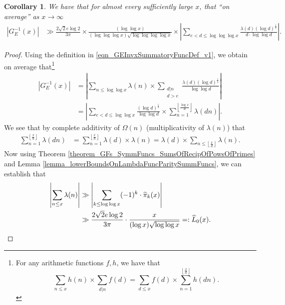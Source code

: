 \documentclass[11pt,reqno,a4letter]{article}
\numberwithin{figure}{section}
\numberwithin{table}{section}
\newcommand{\cf}{\textit{cf.\ }}
\newcommand{\Floor}[2]{\ensuremath{\left\lfloor \frac{#1}{#2} \right\rfloor}}
\theoremstyle{plain}
\newtheorem{cor}[theorem]{Corollary}
\numberwithin{theorem}{section}
\theoremstyle{definition}
\newcommand{\NBRef}[1]{}
\newcommand{\SuccSim}[0]{\overset{_{\scriptsize{\blacktriangle}}}{\succsim}}
\renewcommand{\SuccSim}[0]{\ensuremath{\gg}}
\begin{document}
\begin{cor} 
\label{cor_ASemiForm_ForGInvx_v1} 
We have that for almost every sufficiently large $x$, that 
``on average'' as $x \rightarrow \infty$ 
\begin{align*} 
\left\lvert G_E^{-1}(x) \right\rvert & \SuccSim 
     \frac{2\sqrt{2} e \log 2}{3\pi} \times 
     \frac{(\log\log x)}{(\log\log\log x) \sqrt{\log\log\log\log x}} \times 
     \left\lvert \sum_{e < d \leq \log\log\log x} 
     \frac{\lambda(d) (\log d)^{\frac{1}{4}}}{d \cdot \log\log d} 
     \right\rvert. 
\end{align*} 
\end{cor} 
\NBRef{A10-2020.04-26} 
\begin{proof} 
Using the definition in \eqref{eqn_GEInvxSummatoryFuncDef_v1}, we obtain on average that\footnote{ 
     For any arithmetic functions $f,h$, we have that \cite[\cf \S 3.10; \S 3.12]{APOSTOLANUMT} 
     \[
     \sum_{n \leq x} h(n) \times \sum_{d|n} f(d) = \sum_{d \leq x} f(d) \times \sum_{n=1}^{\Floor{x}{d}} h(dn). 
     \] 
}
\begin{align*} 
\left\lvert G_E^{-1}(x) \right\rvert & = 
     \left\lvert \sum_{n \leq \log\log x} \lambda(n) \times 
     \sum_{\substack{d|n \\ d > e}} \frac{\lambda(d) (\log d)^{\frac{1}{4}}}{\log\log d} \right\rvert \\ 
     & = \left\lvert \sum_{e < d \leq \log\log x} \frac{(\log d)^{\frac{1}{4}}}{\log\log d} \times 
     \sum_{n=1}^{\Floor{\log x}{d}} \lambda(dn) \right\rvert. 
\end{align*} 
We see that by complete additivity of $\Omega(n)$ 
(multiplicativity of $\lambda(n)$) that 
\begin{align*} 
\sum_{n=1}^{\Floor{x}{d}} \lambda(dn) & = \sum_{n=1}^{\Floor{x}{d}} \lambda(d) \times \lambda(n) 
     = \lambda(d) \times \sum_{n \leq \Floor{x}{d}} \lambda(n). 
\end{align*} 
Now using Theorem \ref{theorem_GFs_SymmFuncs_SumsOfRecipOfPowsOfPrimes} and 
Lemma \ref{lemma_lowerBoundsOnLambdaFuncParitySummFuncs}, 
we can establish that 
\begin{align} 
\label{eqn_proof_tag_GEInvxLowerBound_v1} 
\left\lvert \sum_{n \leq x} \lambda(n) \right\rvert & \gg 
     \left\lvert \sum_{k \leq \log\log x} (-1)^k \cdot \widehat{\pi}_k(x) \right\rvert \\ 
\notag 
     & \gg \frac{2\sqrt{2} e \log 2}{3\pi} \cdot 
     \frac{x}{(\log x) \sqrt{\log\log x}} 
     =: \widehat{L}_0(x). 
\end{align} 

\end{proof}
\end{document}
